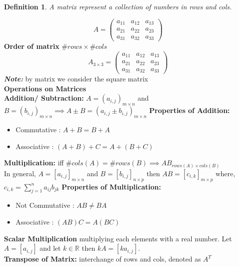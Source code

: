 \documentclass[12pt]{article}
\newcommand{\R}{\mathbb{R}}
\newtheorem*{defn}{Definition}
\begin{document}
 

\rhead{\today}
 
\begin{defn}\normalfont
	A matrix represent a collection of numbers in rows and cols.
\end{defn}
$$ 
A = \begin{pmatrix}
	a_{11} & a_{12} & a_{13} \\
	a_{21} & a_{22} & a_{23} \\
	a_{31} & a_{32} & a_{33} 
\end{pmatrix} 
$$
\textbf{Order of matrix} $\#rows \times \#cols$
$$ 
A_{3\times 3} = \begin{pmatrix}
a_{11} & a_{12} & a_{13} \\
a_{21} & a_{22} & a_{23} \\
a_{31} & a_{32} & a_{33} 
\end{pmatrix}
$$
\textbf{\textit{Note:}} by matrix we consider the square matrix \\
\textbf{Operations on Matrices}\\
\textbf{Addition/ Subtraction:} $A=(a_{i,j})_{m\times n}$ and $B=(b_{i,j})_{m\times n} \implies A\pm B = (a_{i,j} \pm b_{i,j})_{m\times n} $
\textbf{Properties of Addition:}
\begin{itemize}
	\item Commutative : $A+B=B+A$
	\item Associative : $(A+B)+C = A+(B+C)$
\end{itemize}
\textbf{Multiplication: } iff $\#cols(A)=\#rows(B) \implies AB_{rows(A)\times cols(B)}$\\
In general, $A=[a_{i,j}]_{m\times n}$ and  $B=[b_{i,j}]_{n\times p}$ then $AB=[c_{i,k}]_{m\times p}$ where, $c_{i,k} = \sum_{j=1}^{n} a_{ij}b_{jk}$ 
\textbf{Properties of Multiplication:}
\begin{itemize}
	\item Not Commutative : $AB\not=BA$
	\item Associative : $(AB)C = A(BC)$
\end{itemize}
\textbf{Scalar Multiplication} multiplying each elements with a real number. Let $A = [a_{i,j}]$ and let $k \in \R$ then $kA = [ka_{i,j}]$. \\
\textbf{Transpose of Matrix: }interchange of rows and cols, denoted as $A^T$ \\
\end{document}
